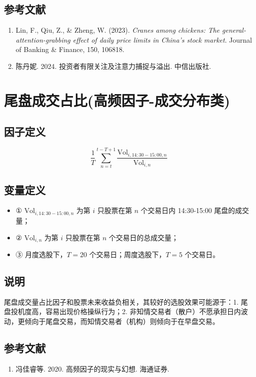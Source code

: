 \documentclass{article}
\begin{document}
\subsection{参考文献}
\begin{enumerate}
    \item Lin, F., Qiu, Z., \& Zheng, W. (2023). \textit{Cranes among chickens: The general-attention-grabbing effect of daily price limits in China's stock market}. Journal of Banking \& Finance, 150, 106818.
    \item 陈丹妮. 2024. 投资者有限关注及注意力捕捉与溢出. 中信出版社.
\end{enumerate}

\section{尾盘成交占比(高频因子-成交分布类)}

\subsection{因子定义}
\begin{equation}
    \frac{1}{T} \sum_{n=t}^{t-T+1} \frac{\mathrm{Vol}_{i,14:30-15:00,n}}{\mathrm{Vol}_{i,n}}
\end{equation}

\subsection{变量定义}
\begin{itemize}
    \item ① \( \mathrm{Vol}_{i,14:30-15:00,n} \) 为第 \( i \) 只股票在第 \( n \) 个交易日内 14:30-15:00 尾盘的成交量；
    \item ② \( \mathrm{Vol}_{i,n} \) 为第 \( i \) 只股票在第 \( n \) 个交易日的总成交量；
    \item ③ 月度选股下，\( T=20 \) 个交易日；周度选股下，\( T=5 \) 个交易日。
\end{itemize}

\subsection{说明}
尾盘成交量占比因子和股票未来收益负相关，其较好的选股效果可能源于：1. 尾盘投机度高，容易出现价格操纵行为；2. 非知情交易者（散户）不愿承担日内波动，更倾向于尾盘交易，而知情交易者（机构）则倾向于在早盘交易。

\subsection{参考文献}
\begin{enumerate}
    \item 冯佳睿等. 2020. 高频因子的现实与幻想. 海通证券.
\end{enumerate}
\end{document}
